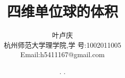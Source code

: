 \documentclass[a4paper, 12pt]{article} %
\makeatletter
\renewcommand{\maketitle}{ %
  \renewcommand\refname{参考文献}
  \newcommand{\D}{\displaystyle}\newcommand{\ri}{\Rightarrow}
  \newcommand{\ds}{\displaystyle} \renewcommand{\ni}{\noindent}
  \newcommand{\pa}{\partial} \newcommand{\Om}{\Omega}
  \newcommand{\om}{\omega} \newcommand{\sik}{\sum_{i=1}^k}
  \newcommand{\vov}{\Vert\omega\Vert} \newcommand{\Umy}{U_{\mu_i,y^i}}
  \newcommand{\lamns}{\lambda_n^{^{\scriptstyle\sigma}}}
  \newcommand{\chiomn}{\chi_{_{\Omega_n}}}
  \newcommand{\ullim}{\underline{\lim}} \newcommand{\bsy}{\boldsymbol}
  \newcommand{\mvb}{\mathversion{bold}} \newcommand{\la}{\lambda}
  \newcommand{\La}{\Lambda} \newcommand{\va}{\varepsilon}
  \newcommand{\be}{\beta} \newcommand{\al}{\alpha}
  \newcommand{\dis}{\displaystyle} \newcommand{\R}{{\mathbb R}}
  \newcommand{\N}{{\mathbb N}} \newcommand{\cF}{{\mathcal F}}
  \newcommand{\gB}{{\mathfrak B}} \newcommand{\eps}{\epsilon}
  \begin{flushright} %
    {\LARGE\@title} %
    
    \vspace{50pt} %
    
    {\large\@author} %
    \\\@date %
    
    \vspace{40pt} %
  \end{flushright}
}
\makeatother
\begin{document}
\begin{CJK}{UTF8}{gkai}
  \title{\textbf{四维单位球的体积}}
  \author{\small{叶卢庆}\\{\small{杭州师范大学理学院,学
        号:1002011005}}\\{\small{Email:h5411167@gmail.com}}} %
  \renewcommand{\today}{\number\year. \number\month. \number\day}
  \date{\today} %
  
  
  
  \maketitle %
  
  
  
  
  
  
  

\end{CJK}
\end{document}
